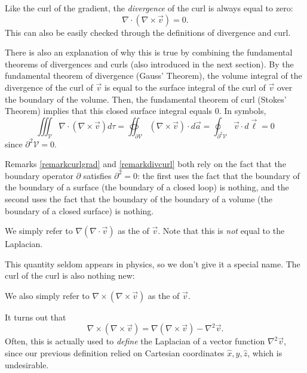 Like the curl of the gradient, the \textit{divergence} of the curl is always equal to zero:
\[\nabla\cdot(\nabla\times \vec{v})=0.\]
This can also be easily checked through the definitions of divergence and curl.

\begin{remark}\label{remarkdivcurl}
There is also an explanation of why this is true by combining the fundamental theorems of divergences and curls (also introduced in the next section). By the fundamental theorem of divergence (Gauss' Theorem), the volume integral of the divergence of the curl of $\vec{v}$ is equal to the surface integral of the curl of $\vec{v}$ over the boundary of the volume. Then, the fundamental theorem of curl (Stokes' Theorem) implies that this closed surface integral equals 0. In symbols,
\[\iiint_\mathcal{V}\nabla\cdot(\nabla\times \vec{v}) d\tau=\oiint_{\partial\mathcal{V}}(\nabla\times\vec{v})\cdot d\vec{a}=\oint_{\partial^2\mathcal{V}}\vec{v}\cdot d\vec{\ell}=0\]
since $\partial^2\mathcal{V}=0$.
\end{remark}

\begin{remark}
Remarks \ref{remarkcurlgrad} and \ref{remarkdivcurl} both rely on the fact that the boundary operator $\partial$ satisfies $\partial^2=0$: the first uses the fact that the boundary of the boundary of a surface (the boundary of a closed loop) is nothing, and the second uses the fact that the boundary of the boundary of a volume (the boundary of a closed surface) is nothing.
\end{remark}

\begin{definition}
    We simply refer to $\nabla(\nabla\cdot \vec{v})$ as the  of $\vec{v}$. Note that this is \textit{not} equal to the Laplacian.
\end{definition}

This quantity seldom appears in physics, so we don't give it a special name. The curl of the curl is also nothing new:

\begin{definition}
    We also simply refer to $\nabla\times(\nabla \times \vec{v})$ as the  of $\vec{v}$.
\end{definition}

It turns out that
\[\nabla\times(\nabla\times \vec{v})=\nabla(\nabla\times \vec{v})-\nabla^2\vec{v}.\]
Often, this is actually used to \textit{define} the Laplacian of a vector function $\nabla^2\vec{v}$, since our previous definition relied on Cartesian coordinates $\hat{x}, \hat{y}, \hat{z}$, which is undesirable.

